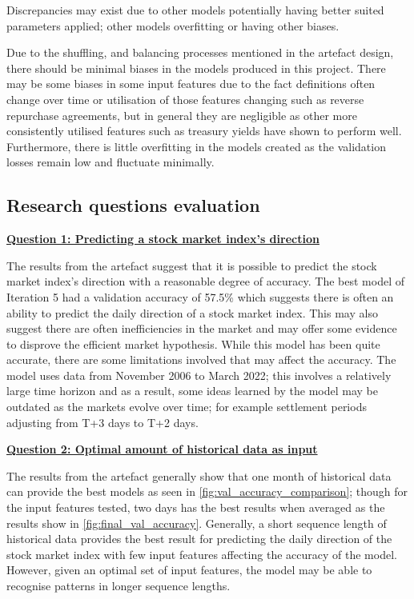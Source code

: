 Discrepancies may exist due to other models potentially having better suited parameters applied;
other models overfitting or having other biases.

Due to the shuffling, and balancing processes mentioned in the artefact design, there should be minimal
biases in the models produced in this project. There may be some biases in some input features due to the
fact definitions often change over time or utilisation of those features changing such as reverse repurchase
agreements, but in general they are negligible as other more consistently utilised features such as treasury
yields have shown to perform well. Furthermore, there is little overfitting in the models created
as the validation losses remain low and fluctuate minimally.

\subsection{Research questions evaluation}
\hyperref[predicting_direction_question]{\textbf{Question 1: Predicting a stock market index's direction}}


The results from the artefact suggest that it is possible to predict the stock market index's direction
with a reasonable degree of accuracy. The best model of Iteration 5 had a validation accuracy of 57.5\%
which suggests there is often an ability to predict the daily direction of a stock market index. This
may also suggest there are often inefficiencies in the market and may offer some evidence to disprove
the efficient market hypothesis. While this model has been quite accurate, there are some limitations
involved that may affect the accuracy. The model uses data from November 2006 to March 2022; this involves
a relatively large time horizon and as a result, some ideas learned by the model may be outdated as the markets
evolve over time; for example settlement periods adjusting from T+3 days to T+2 days.

\hyperref[optimal_historical_question]{\textbf{Question 2: Optimal amount of historical data as input}}

The results from the artefact generally show that one month of historical data can provide the best models as seen in \autoref{fig:val_accuracy_comparison};
though for the input features tested, two days has the best results when averaged as the results show in \autoref{fig:final_val_accuracy}.
Generally, a short sequence length of historical data provides
the best result for predicting the daily direction of the stock market index with few input features affecting the accuracy of the
model. However, given an optimal set of input features, the model may be able to recognise patterns in longer sequence lengths.


